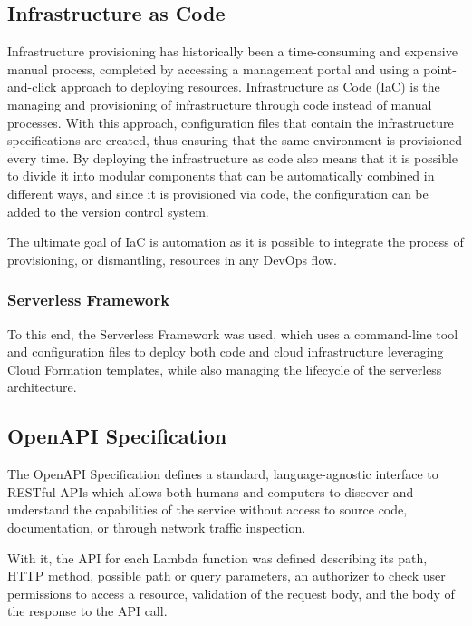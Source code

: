 \subsection{Infrastructure as Code} \label{IaC}
Infrastructure provisioning has historically been a time-consuming and expensive manual process, completed by accessing a management portal and using a point-and-click approach to deploying resources.
Infrastructure as Code (IaC) is the managing and provisioning of infrastructure through code instead of manual processes. With this approach, configuration files that contain the infrastructure specifications are created, thus ensuring that the same environment is provisioned every time. By deploying the infrastructure as code also means that it is possible to divide it into modular components that can be automatically combined in different ways, and since it is provisioned via code, the configuration can be added to the version control system. 

The ultimate goal of IaC is automation as it is possible to integrate the process of provisioning, or dismantling, resources in any DevOps flow.

\subsubsection{Serverless Framework}
To this end, the Serverless Framework \cite{slsf} was used, which uses a command-line tool and configuration files to deploy both code and cloud infrastructure leveraging Cloud Formation templates, while also managing the lifecycle of the serverless architecture.


\subsection{OpenAPI Specification}
\begin{definition}
The OpenAPI Specification defines a standard, language-agnostic interface to RESTful APIs which allows both humans and computers to discover and understand the capabilities of the service without access to source code, documentation, or through network traffic inspection. \cite{openApi}
\end{definition}
With it, the API for each Lambda function was defined describing its path, HTTP method, possible path or query parameters, an authorizer to check user permissions to access a resource, validation of the request body, and the body of the response to the API call.



